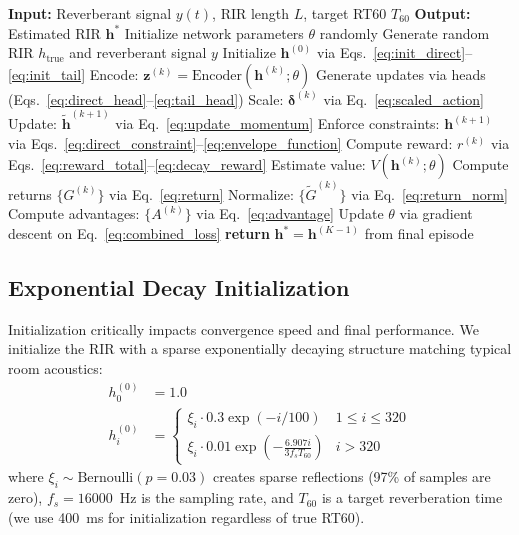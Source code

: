 \documentclass[12pt,a4paper]{article}
\begin{document}
\begin{algorithm}[t]
\caption{Test-Time RL for Blind RIR Estimation}
\label{alg:rir_estimation}
\begin{algorithmic}[1]
\STATE \textbf{Input:} Reverberant signal $y(t)$, RIR length $L$, target RT60 $T_{60}$
\STATE \textbf{Output:} Estimated RIR $\mathbf{h}^*$
\STATE Initialize network parameters $\theta$ randomly
    \STATE Generate random RIR $h_{\text{true}}$ and reverberant signal $y$
    \STATE Initialize $\mathbf{h}^{(0)}$ via Eqs.~\eqref{eq:init_direct}--\eqref{eq:init_tail}
        \STATE Encode: $\mathbf{z}^{(k)} = \text{Encoder}(\mathbf{h}^{(k)}; \theta)$
        \STATE Generate updates via heads (Eqs.~\eqref{eq:direct_head}--\eqref{eq:tail_head})
        \STATE Scale: $\boldsymbol{\delta}^{(k)}$ via Eq.~\eqref{eq:scaled_action}
        \STATE Update: $\tilde{\mathbf{h}}^{(k+1)}$ via Eq.~\eqref{eq:update_momentum}
        \STATE Enforce constraints: $\mathbf{h}^{(k+1)}$ via Eqs.~\eqref{eq:direct_constraint}--\eqref{eq:envelope_function}
        \STATE Compute reward: $r^{(k)}$ via Eqs.~\eqref{eq:reward_total}--\eqref{eq:decay_reward}
        \STATE Estimate value: $V(\mathbf{h}^{(k)}; \theta)$
    \ENDFOR
    \STATE Compute returns $\{G^{(k)}\}$ via Eq.~\eqref{eq:return}
    \STATE Normalize: $\{\tilde{G}^{(k)}\}$ via Eq.~\eqref{eq:return_norm}
    \STATE Compute advantages: $\{A^{(k)}\}$ via Eq.~\eqref{eq:advantage}
    \STATE Update $\theta$ via gradient descent on Eq.~\eqref{eq:combined_loss}
\ENDFOR
\STATE \textbf{return} $\mathbf{h}^* = \mathbf{h}^{(K-1)}$ from final episode
\end{algorithmic}
\end{algorithm}

\subsection{Exponential Decay Initialization}
\label{sec:initialization}

Initialization critically impacts convergence speed and final performance. We initialize the RIR with a sparse exponentially decaying structure matching typical room acoustics:
\begin{align}
h_0^{(0)} &= 1.0 \label{eq:init_direct} \\
h_i^{(0)} &= \begin{cases}
\xi_i \cdot 0.3\exp(-i/100) & 1 \leq i \leq 320 \\
\xi_i \cdot 0.01\exp\left(-\frac{6.907i}{3f_s T_{60}}\right) & i > 320
\end{cases}
\label{eq:init_tail}
\end{align}
where $\xi_i \sim \text{Bernoulli}(p=0.03)$ creates sparse reflections (97\% of samples are zero), $f_s=16000$~Hz is the sampling rate, and $T_{60}$ is a target reverberation time (we use 400~ms for initialization regardless of true RT60).
\end{document}
